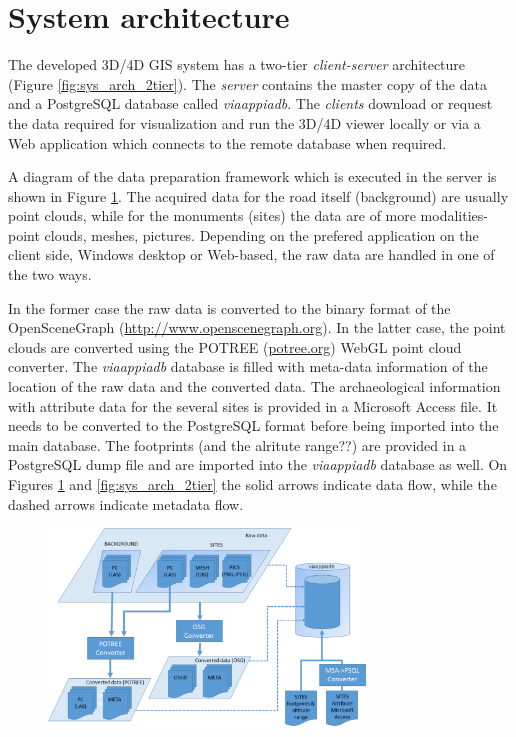 \section{System architecture}
\label{sec:sys_arch}

The developed 3D/4D GIS system has a two-tier {\em client-server} architecture (Figure \ref{fig:sys_arch_2tier}). The {\em server} contains the master copy of the data and a PostgreSQL database called \textit{viaappiadb}. The {\em clients} download or request the data required for visualization and run the 3D/4D viewer locally or via a Web application which connects to the remote database when required.
 
A diagram of the data preparation framework which is executed in the server is shown in Figure \ref{fig:sys_arch_data_framework}. The acquired data for the road itself (background) are usually point clouds, while for the monuments (sites) the data are of more modalities- point clouds, meshes, pictures. Depending on the prefered application on the client side, Windows desktop or Web-based, the raw data are handled in one of the two ways. 

In the former case the raw data is converted to the binary format of the OpenSceneGraph (\url{http://www.openscenegraph.org}). In the latter case, the point clouds are converted using the POTREE (\url{potree.org}) WebGL point cloud converter. The \textit{viaappiadb} database is filled with meta-data information of the location of the raw data and the converted data. The archaeological information with attribute data for the several sites is provided in a Microsoft Access file. It needs to be converted to the PostgreSQL format before being imported into the main database. The footprints (and the alritute range??) are provided in a PostgreSQL dump file and are imported into the \textit{viaappiadb} database as well. On Figures \ref{fig:sys_arch_data_framework} and \ref{fig:sys_arch_2tier} the solid arrows indicate data flow, while the dashed arrows indicate metadata flow.

\begin{figure}[!ht]
 \centering
 \includegraphics[width=0.75\textwidth]{fig/system_architecture/DataFramework.pdf}
 \caption{}
 \label{fig:sys_arch_data_framework}
\end{figure}

